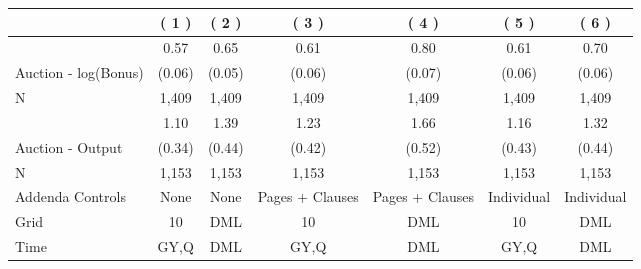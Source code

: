 
\begin{tabular}{lcccccc}
\toprule
  & ( 1 ) & ( 2 ) & ( 3 ) & ( 4 ) & ( 5 ) & ( 6 )\\
\midrule
 & 0.57 & 0.65 & 0.61 & 0.80 & 0.61 & 0.70\\

\multirow{-2}{*}{\raggedright\arraybackslash Auction - log(Bonus)} & (0.06) & (0.05) & (0.06) & (0.07) & (0.06) & (0.06)\\

N & 1,409 & 1,409 & 1,409 & 1,409 & 1,409 & 1,409\\

\midrule
 & 1.10 & 1.39 & 1.23 & 1.66 & 1.16 & 1.32\\

\multirow{-2}{*}{\raggedright\arraybackslash Auction - Output} & (0.34) & (0.44) & (0.42) & (0.52) & (0.43) & (0.44)\\

N & 1,153 & 1,153 & 1,153 & 1,153 & 1,153 & 1,153\\

\midrule
Addenda Controls & None & None & Pages + Clauses & Pages + Clauses & Individual & Individual\\

Grid & 10 & DML & 10 & DML & 10 & DML\\

Time & GY,Q & DML & GY,Q & DML & GY,Q & DML\\
\bottomrule
\end{tabular}
